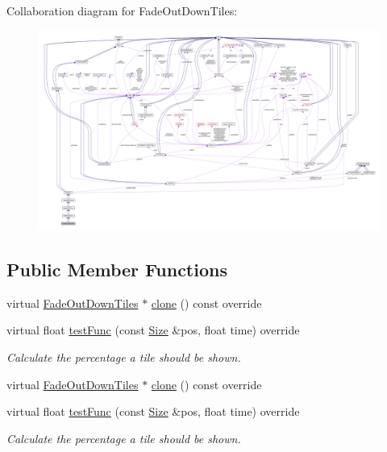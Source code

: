 Collaboration diagram for Fade\+Out\+Down\+Tiles\+:
\nopagebreak
\begin{figure}[H]
\begin{center}
\leavevmode
\includegraphics[width=350pt]{classFadeOutDownTiles__coll__graph}
\end{center}
\end{figure}
\subsection*{Public Member Functions}
\begin{DoxyCompactItemize}
\item 
virtual \hyperlink{classFadeOutDownTiles}{Fade\+Out\+Down\+Tiles} $\ast$ \hyperlink{classFadeOutDownTiles_a4a35c11502bbb834d6d4137cb03d2843}{clone} () const override
\item 
virtual float \hyperlink{classFadeOutDownTiles_a6fa98b6fda5e72b41542f4209866c3f3}{test\+Func} (const \hyperlink{classSize}{Size} \&pos, float time) override
\begin{DoxyCompactList}\small\item\em Calculate the percentage a tile should be shown. \end{DoxyCompactList}\item 
virtual \hyperlink{classFadeOutDownTiles}{Fade\+Out\+Down\+Tiles} $\ast$ \hyperlink{classFadeOutDownTiles_aa7b17d06be4e0d54a401464fd3edcee1}{clone} () const override
\item 
virtual float \hyperlink{classFadeOutDownTiles_a650db33238577e696174930b01d06045}{test\+Func} (const \hyperlink{classSize}{Size} \&pos, float time) override
\begin{DoxyCompactList}\small\item\em Calculate the percentage a tile should be shown. \end{DoxyCompactList}\end{DoxyCompactItemize}
